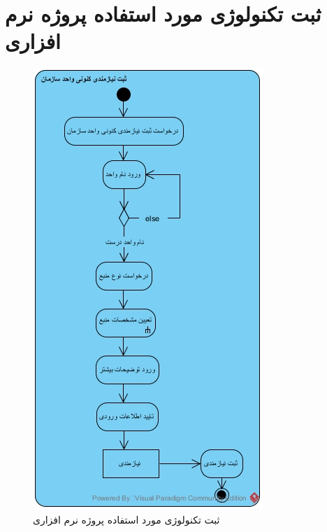 \section{ثبت تکنولوژی مورد استفاده پروژه نرم افزاری}
\begin{figure}[H]
	\centering
	\includegraphics[scale=0.8]{img/activity/subreq}
	\caption{ثبت تکنولوژی مورد استفاده پروژه نرم افزاری}
\end{figure}

